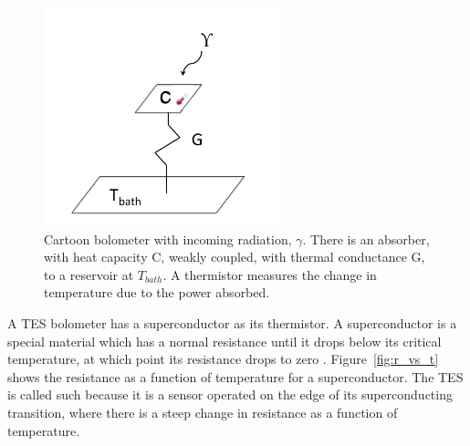 \begin{figure}[htp]
\begin{center}
\includegraphics[height=2.5in]{figures/bolometer_cartoon}
\caption{Cartoon bolometer with incoming radiation, $\gamma$. There is an absorber, with heat capacity C, weakly coupled, with thermal conductance G, to a reservoir at $T_{bath}$. A thermistor measures the change in temperature due to the power absorbed. 
\label{fig:bolometer_cartoon} }
\end{center}
\end{figure}

A \ac{TES} bolometer has a superconductor as its thermistor. 
A superconductor is a special material which has a normal resistance until it drops below its critical temperature, at which point its resistance drops to zero \cite{tinkham}.
Figure~\ref{fig:r_vs_t} shows the resistance as a function of temperature for a superconductor. 
The \ac{TES} is called such because it is a sensor operated on the edge of its superconducting transition, where there is a steep change in resistance as a function of temperature. 

